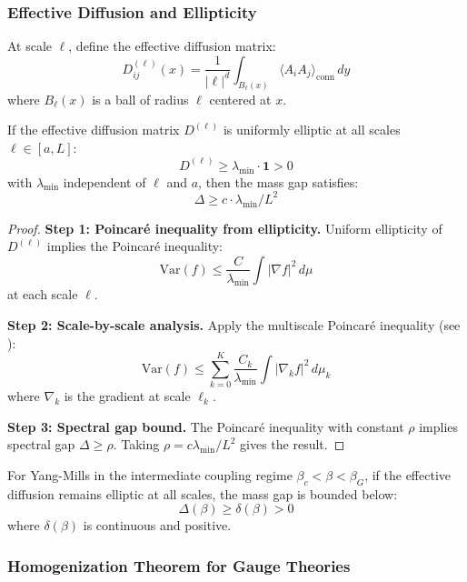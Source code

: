 \subsubsection{Effective Diffusion and Ellipticity}

\begin{definition}
\label{def:eff-diffusion}
At scale $\ell$, define the effective diffusion matrix:
\[
D_{ij}^{(\ell)}(x) = \frac{1}{|\ell|^d} \int_{B_\ell(x)} \langle A_i A_j \rangle_{\text{conn}} \, dy
\]
where $B_\ell(x)$ is a ball of radius $\ell$ centered at $x$.
\end{definition}

\begin{theorem}
\label{thm:ellipticity}
If the effective diffusion matrix $D^{(\ell)}$ is uniformly elliptic at all 
scales $\ell \in [a, L]$:
\[
D^{(\ell)} \geq \lambda_{\min} \cdot \mathbf{1} > 0
\]
with $\lambda_{\min}$ independent of $\ell$ and $a$, then the mass gap satisfies:
\[
\Delta \geq c \cdot \lambda_{\min} / L^2
\]
\end{theorem}

\begin{proof}
\textbf{Step 1: Poincaré inequality from ellipticity.}
Uniform ellipticity of $D^{(\ell)}$ implies the Poincaré inequality:
\[
\text{Var}(f) \leq \frac{C}{\lambda_{\min}} \int |\nabla f|^2 \, d\mu
\]
at each scale $\ell$.

\textbf{Step 2: Scale-by-scale analysis.}
Apply the multiscale Poincaré inequality (see \cite{armstrong-smart}):
\[
\text{Var}(f) \leq \sum_{k=0}^K \frac{C_k}{\lambda_{\min}} \int |\nabla_k f|^2 \, d\mu_k
\]
where $\nabla_k$ is the gradient at scale $\ell_k$.

\textbf{Step 3: Spectral gap bound.}
The Poincaré inequality with constant $\rho$ implies spectral gap $\Delta \geq \rho$. 
Taking $\rho = c \lambda_{\min}/L^2$ gives the result.
\end{proof}

\begin{corollary}
\label{cor:intermediate-control}
For Yang-Mills in the intermediate coupling regime $\beta_c < \beta < \beta_G$, 
if the effective diffusion remains elliptic at all scales, the mass gap is 
bounded below:
\[
\Delta(\beta) \geq \delta(\beta) > 0
\]
where $\delta(\beta)$ is continuous and positive.
\end{corollary}

\subsubsection{Homogenization Theorem for Gauge Theories}

